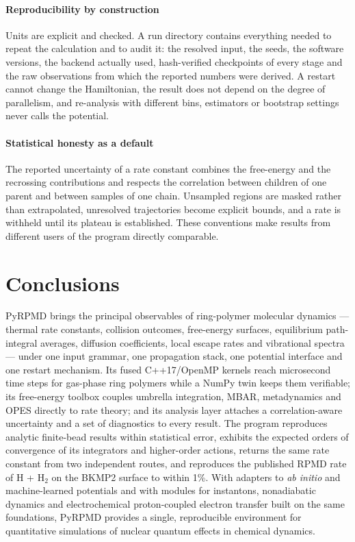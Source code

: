 \documentclass[preprint,12pt]{elsarticle}
\begin{document}
\paragraph{Reproducibility by construction} Units are explicit and checked. A run directory contains everything needed to repeat the calculation and to audit it: the resolved input, the seeds, the software versions, the backend actually used, hash-verified checkpoints of every stage and the raw observations from which the reported numbers were derived. A restart cannot change the Hamiltonian, the result does not depend on the degree of parallelism, and re-analysis with different bins, estimators or bootstrap settings never calls the potential.

\paragraph{Statistical honesty as a default} The reported uncertainty of a rate constant combines the free-energy and the recrossing contributions and respects the correlation between children of one parent and between samples of one chain. Unsampled regions are masked rather than extrapolated, unresolved trajectories become explicit bounds, and a rate is withheld until its plateau is established. These conventions make results from different users of the program directly comparable.

\section{Conclusions}
\label{sec:conclusions}

PyRPMD brings the principal observables of ring-polymer molecular dynamics --- thermal rate constants, collision outcomes, free-energy surfaces, equilibrium path-integral averages, diffusion coefficients, local escape rates and vibrational spectra --- under one input grammar, one propagation stack, one potential interface and one restart mechanism. Its fused C++17/OpenMP kernels reach microsecond time steps for gas-phase ring polymers while a NumPy twin keeps them verifiable; its free-energy toolbox couples umbrella integration, MBAR, metadynamics and OPES directly to rate theory; and its analysis layer attaches a correlation-aware uncertainty and a set of diagnostics to every result. The program reproduces analytic finite-bead results within statistical error, exhibits the expected orders of convergence of its integrators and higher-order actions, returns the same rate constant from two independent routes, and reproduces the published RPMD rate of H + H$_2$ on the BKMP2 surface to within 1\%. With adapters to \emph{ab initio} and machine-learned potentials and with modules for instantons, nonadiabatic dynamics and electrochemical proton-coupled electron transfer built on the same foundations, PyRPMD provides a single, reproducible environment for quantitative simulations of nuclear quantum effects in chemical dynamics.
\end{document}
